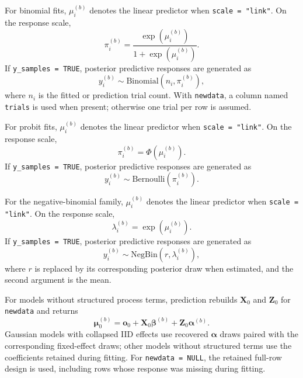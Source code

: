 \documentclass[11pt]{article}
\newcommand{\balpha}{\bm{\alpha}}
\newcommand{\bbeta}{\bm{\beta}}
\newcommand{\bo}{\bm{o}}
\newcommand{\bmu}{\bm{\mu}}
\newcommand{\bX}{\bm{X}}
\newcommand{\bZ}{\bm{Z}}
\begin{document}
For binomial fits, $\mu_i^{(b)}$ denotes the linear predictor when \texttt{scale = "link"}. On the response scale,
\begin{equation}
  \pi_i^{(b)} =
  \frac{\exp(\mu_i^{(b)})}{1+\exp(\mu_i^{(b)})}.
\end{equation}
If \texttt{y\_samples = TRUE}, posterior predictive responses are generated as
\begin{equation}
  y_i^{(b)} \sim \mathrm{Binomial}(n_i,\pi_i^{(b)}),
\end{equation}
where $n_i$ is the fitted or prediction trial count. With \texttt{newdata}, a column named \texttt{trials} is used when present; otherwise one trial per row is assumed.

For probit fits, $\mu_i^{(b)}$ denotes the linear predictor when \texttt{scale = "link"}. On the response scale,
\begin{equation}
  \pi_i^{(b)} = \Phi\left(\mu_i^{(b)}\right).
\end{equation}
If \texttt{y\_samples = TRUE}, posterior predictive responses are generated as
\begin{equation}
  y_i^{(b)} \sim \mathrm{Bernoulli}(\pi_i^{(b)}).
\end{equation}

For the negative-binomial family, $\mu_i^{(b)}$ denotes the linear predictor when \texttt{scale = "link"}. On the response scale,
\begin{equation}
  \lambda_i^{(b)} = \exp(\mu_i^{(b)}).
\end{equation}
If \texttt{y\_samples = TRUE}, posterior predictive responses are generated as
\begin{equation}
  y_i^{(b)} \sim \mathrm{NegBin}(r,\lambda_i^{(b)}),
\end{equation}
where $r$ is replaced by its corresponding posterior draw when estimated, and the second argument is the mean.

For models without structured process terms, prediction rebuilds $\bX_0$ and $\bZ_0$ for \texttt{newdata} and returns
\begin{equation}
  \bmu_0^{(b)} = \bo_0 + \bX_0 \bbeta^{(b)} + \bZ_0 \balpha^{(b)} .
\end{equation}
Gaussian models with collapsed IID effects use recovered $\balpha$ draws paired with the corresponding fixed-effect draws; other models without structured terms use the coefficients retained during fitting. For \texttt{newdata = NULL}, the retained full-row design is used, including rows whose response was missing during fitting.
\end{document}
